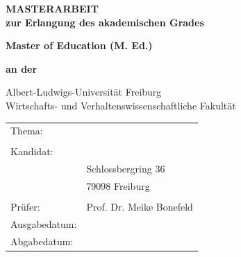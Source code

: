 \thispagestyle{empty}
{
	\setlength{\parskip}{1cm}
	\begin{center}
		\vspace*{1cm}
		\textbf{\Huge MASTERARBEIT}
		\vspace{2cm}\\
		
		\textbf{zur Erlangung des akademischen Grades}
		
		\textbf{\Large Master of Education (M. Ed.)}
		
		\textbf{an der}
		
		{\huge Albert-Ludwigs-Universität Freiburg}\\
		
		{\Large Wirtschafts- und Verhaltenswissenschaftliche Fakultät}
		\vspace{1cm}
		
		\renewcommand{\arraystretch}{1.0}	%
		\begin{tabular}{p{4cm} p{10cm}}
			Thema: & \thetitle \\&\\
			Kandidat: & \theauthor \\
			& Schlossbergring 36 \\
			& 79098 Freiburg \\&\\
			Prüfer: & Prof. Dr. Meike Bonefeld \\
			Ausgabedatum: & \datestart \\
			Abgabedatum: & \dateend \\
		\end{tabular}
		\renewcommand{\arraystretch}{1.5}	%
	\end{center}
}
\newpage